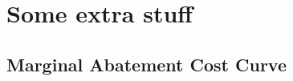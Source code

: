\chapter{Some extra stuff}
\label{AppendixA}

\section{Marginal Abatement Cost Curve}
\label{sec:MACC}









